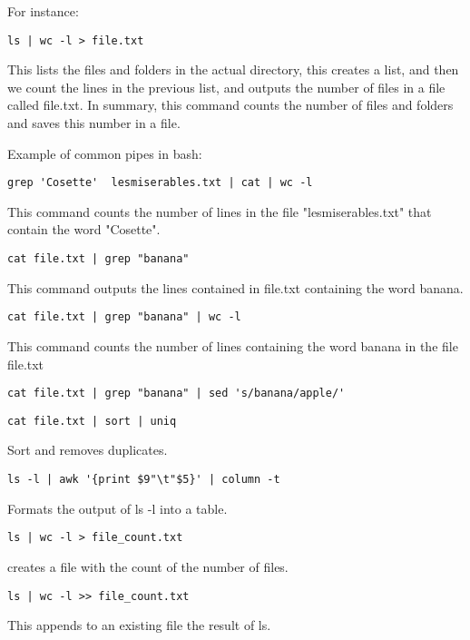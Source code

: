 \documentclass[24pt]{article}
\begin{document}
For instance:
\begin{lstlisting}
ls | wc -l > file.txt
\end{lstlisting}

This lists the files and folders in the actual directory, this creates a list, and then we count the lines in the previous list, and outputs the number of files in a file called file.txt. In summary, this command counts the number of files and folders and saves this number in a file.

Example of common pipes in bash:

\begin{lstlisting}
grep 'Cosette'  lesmiserables.txt | cat | wc -l 
\end{lstlisting}
This command counts the number of lines in the file "lesmiserables.txt" that contain the word "Cosette".

\begin{lstlisting}
cat file.txt | grep "banana"
\end{lstlisting}

This command outputs the lines contained in file.txt containing the word banana.

\begin{lstlisting}
cat file.txt | grep "banana" | wc -l
\end{lstlisting}

This command counts the number of lines containing the word banana in the file file.txt

\begin{lstlisting}
cat file.txt | grep "banana" | sed 's/banana/apple/'
\end{lstlisting}


\begin{lstlisting}
cat file.txt | sort | uniq
\end{lstlisting}
Sort and removes duplicates.

\begin{lstlisting}
ls -l | awk '{print $9"\t"$5}' | column -t
\end{lstlisting}
Formats the output of ls -l into a table.

\begin{lstlisting}
ls | wc -l > file_count.txt
\end{lstlisting}
creates a file with the count of the number of files. 

\begin{lstlisting}
ls | wc -l >> file_count.txt
\end{lstlisting}
This appends to an existing file the result of ls.
\end{document}
